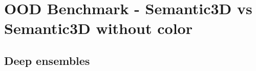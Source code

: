     \section{OOD Benchmark - Semantic3D vs Semantic3D without color}
    \subsection{Deep ensembles}

